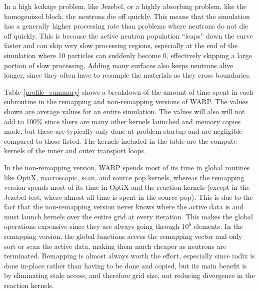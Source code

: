 In a high leakage problem, like Jezebel, or a highly absorbing problem, like the homogenized block, the neutrons die off quickly.  This means that the simulation has a generally higher processing rate than problems where neutrons do not die off quickly.  This is because the active neutron population ``leaps'' down the curve faster and can skip very slow processing regions, especially at the end of the simulation where 10 particles can suddenly become 0, effectively skipping a large portion of slow processing.  Adding many surfaces also keeps neutrons alive longer, since they often have to resample the materials as they cross boundaries.  

Table \ref{profile_summary} shows a breakdown of the amount of time spent in each subroutine in the remapping and non-remapping versions of WARP.  The values shown are average values for an entire simulation.  The values will also will not add to 100\% since there are many other kernels launched and memory copies made, but these are typically only done at problem startup and are negligible compared to those listed.  The kernels included in the table are the compute kernels of the inner and outer transport loops.  

In the non-remapping version, WARP spends most of its time in global routines like OptiX, macroscopic, scan, and source pop kernels, whereas the remapping version spends most of its time in OptiX and the reaction kernels (except in the Jezebel test, where almost all time is spent in the source pop).  This is due to the fact that the non-remapping version never knows where the active data is and must launch kernels over the entire grid at every iteration.  This makes the global operations expensive since they are always going through $10^6$ elements.  In the remapping version, the global functions access the remapping vector and only sort or scan the active data, making them much cheaper as neutrons are terminated.  Remapping is almost always worth the effort, especially since radix is done in-place rather than having to be done and copied, but its main benefit is by eliminating stale access, and therefore grid size, not reducing divergence in the reaction kernels.%




